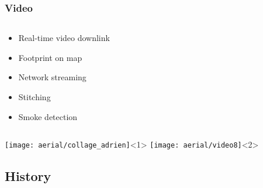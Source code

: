 %
\begin{frame}
\frametitle{Video}

\begin{columns}
\begin{column}{5cm}
\begin{itemize}
\item Real-time video downlink
\item Footprint on map
\item Network streaming
\item Stitching
\item Smoke detection
\end{itemize}
\end{column}
\begin{column}{5cm}
\begin{center}
\end{center}
\end{column}
\end{columns}
\begin{center}
\texttt{[image: aerial/collage\_adrien]}<1>
\texttt{[image: aerial/video8]}<2>
\end{center}
\end{frame}


%
%
\subsection{History}
